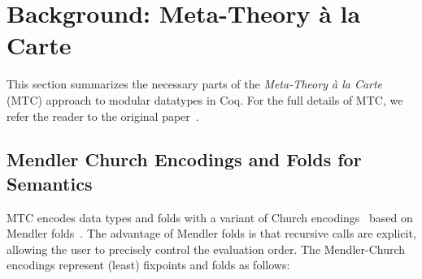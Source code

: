 \HaskellReset

\makeatother
\EndFmtInput

























\section{Background: Meta-Theory \`a la Carte}\label{s:mtc}

This section summarizes the necessary parts of the
\emph{Meta-Theory \`a la Carte} (MTC) approach to modular datatypes in
Coq.  For the full details of MTC, we refer the reader to the original paper~\cite{mtc}.

\subsection{Mendler Church Encodings and Folds for Semantics}

MTC encodes data types and folds with a variant of Church
encodings~\cite{bohm85automatic,pfenning90inductively} based on Mendler
folds~\cite{uustalu00mendler}.  The advantage of Mendler folds is that
recursive calls are explicit, allowing the user to precisely control the
evaluation order. The Mendler-Church encodings represent (least) fixpoints and folds as
follows:



